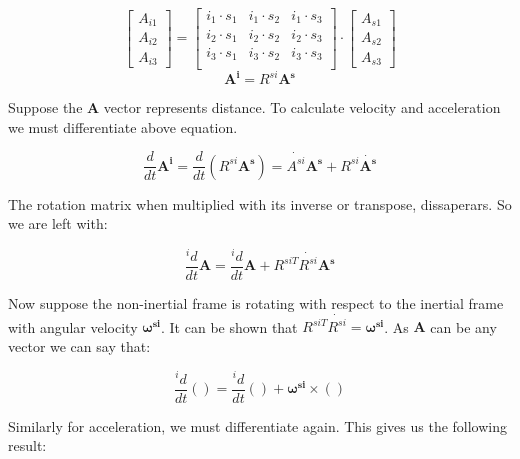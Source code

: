 \documentclass[12pt, letterpaper]{article}
\begin{document}
\begin{displaymath}
	\begin{bmatrix} A_{i1} \\ A_{i2} \\ A_{i3} \end{bmatrix} 
	=
	\begin{bmatrix}
	i_{1} \cdot s_{1} & i_{1} \cdot s_{2} & i_{1} \cdot s_{3}\\
	i_{2} \cdot s_{1} & i_{2} \cdot s_{2} & i_{2} \cdot s_{3}\\
	i_{3} \cdot s_{1} & i_{3} \cdot s_{2} & i_{3} \cdot s_{3}\\
	\end{bmatrix}
	\cdot
	\begin{bmatrix}
	A_{s1} \\ A_{s2} \\ A_{s3}
	\end{bmatrix}
\end{displaymath}
\begin{displaymath}	\mathbf{A^i} = R^{si}\mathbf{A^s} \end{displaymath}

Suppose the $\mathbf{A}$ vector represents distance. To calculate velocity and acceleration we must differentiate above equation. 

\begin{displaymath}
\frac{d}{dt}\mathbf{A^i} = \frac{d}{dt}(R^{si}\mathbf{A^s}) = \Dot{A^{si}}\mathbf{A^s} + R^{si}\Dot{\mathbf{A^s}}
\end{displaymath}

The rotation matrix when multiplied with its inverse or transpose, dissaperars. So we are left with:

\begin{displaymath}
\frac{{}^id}{dt}\mathbf{A} = \frac{{}^id}{dt}\mathbf{A} + R^{siT}\Dot{R^{si}}\mathbf{A^s}
\end{displaymath}

Now suppose the non-inertial frame is rotating with respect to the inertial frame with angular velocity $\mathbf{\omega^{si}}$. It can be shown that $R^{siT}\Dot{R^{si}} = \mathbf{\omega^{si}}$. As $\mathbf{A}$ can be any vector we can say that: 

\begin{displaymath}
\frac{{}^id}{dt}( ) = \frac{{}^id}{dt}( ) + \mathbf{\omega^{si}}\times()
\end{displaymath}

Similarly for acceleration, we must differentiate again. This gives us the following result:
\end{document}

